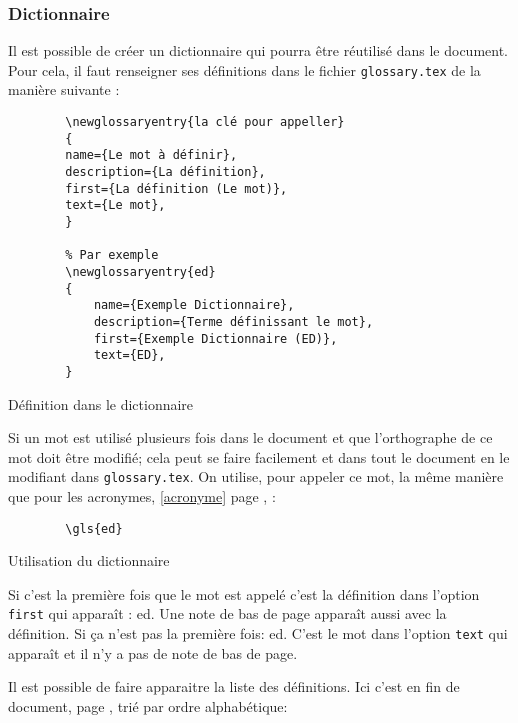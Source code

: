 \subsubsection{Dictionnaire} \label{dictionnaire}
Il est possible de créer un dictionnaire qui pourra être réutilisé dans le document.
Pour cela, il faut renseigner ses définitions dans le fichier \verb=glossary.tex= de la manière suivante :
\begin{code}
    \begin{verbatim}
        \newglossaryentry{la clé pour appeller}
        {
        name={Le mot à définir},
        description={La définition},
        first={La définition (Le mot)},
        text={Le mot},
        }

        % Par exemple
        \newglossaryentry{ed}
        {
            name={Exemple Dictionnaire},
            description={Terme définissant le mot},
            first={Exemple Dictionnaire (ED)},
            text={ED},
        }
\end{verbatim}
    \caption{Définition dans le dictionnaire}
\end{code}

Si un mot est utilisé plusieurs fois dans le document et que l'orthographe de ce mot doit être modifié;
cela peut se faire facilement et dans tout le document en le modifiant dans \verb=glossary.tex=.
On utilise, pour appeler ce mot, la même manière que pour les acronymes, \ref{acronyme} page \pageref{acronyme}, :
\begin{code}
    \begin{verbatim}
        \gls{ed}
\end{verbatim}
    \caption{Utilisation du dictionnaire}
\end{code}

Si c'est la première fois que le mot est appelé c'est la définition dans l'option \verb=first= qui apparaît : \gls{ed}.
Une note de bas de page apparaît aussi avec la définition. \newline
Si ça n'est pas la première fois: \gls{ed}. C'est le mot dans l'option \verb=text= qui apparaît et il n'y a pas de note de bas de page.

Il est possible de faire apparaitre la liste des définitions. Ici c'est en fin de document,
page \pageref{dictionnaireDomaine}, trié par ordre alphabétique:

